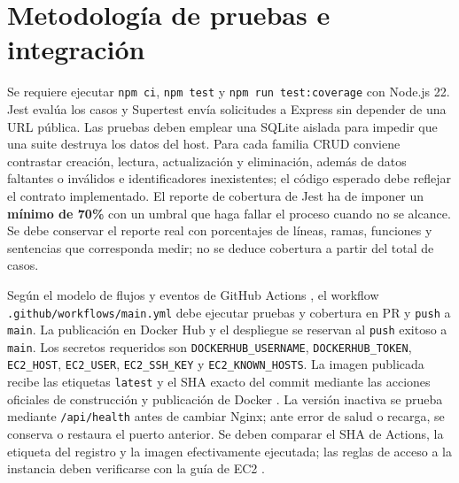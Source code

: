 \documentclass[12pt,a4paper]{article}
\begin{document}
\section{Metodología de pruebas e integración}
Se requiere ejecutar \texttt{npm ci}, \texttt{npm test} y \texttt{npm run test:coverage} con Node.js 22. Jest evalúa los casos y Supertest envía solicitudes a Express sin depender de una URL pública. Las pruebas deben emplear una SQLite aislada para impedir que una suite destruya los datos del host. Para cada familia CRUD conviene contrastar creación, lectura, actualización y eliminación, además de datos faltantes o inválidos e identificadores inexistentes; el código esperado debe reflejar el contrato implementado. El reporte de cobertura de Jest ha de imponer un \textbf{mínimo de 70\%} con un umbral que haga fallar el proceso cuando no se alcance. Se debe conservar el reporte real con porcentajes de líneas, ramas, funciones y sentencias que corresponda medir; no se deduce cobertura a partir del total de casos.

Según el modelo de flujos y eventos de GitHub Actions \cite{github}, el workflow \texttt{.github/workflows/main.yml} debe ejecutar pruebas y cobertura en PR y \texttt{push} a \texttt{main}. La publicación en Docker Hub y el despliegue se reservan al \texttt{push} exitoso a \texttt{main}. Los secretos requeridos son \texttt{DOCKERHUB\_USERNAME}, \texttt{DOCKERHUB\_TOKEN}, \texttt{EC2\_HOST}, \texttt{EC2\_USER}, \texttt{EC2\_SSH\_KEY} y \texttt{EC2\_KNOWN\_HOSTS}. La imagen publicada recibe las etiquetas \texttt{latest} y el SHA exacto del commit mediante las acciones oficiales de construcción y publicación de Docker \cite{docker}. La versión inactiva se prueba mediante \texttt{/api/health} antes de cambiar Nginx; ante error de salud o recarga, se conserva o restaura el puerto anterior. Se deben comparar el SHA de Actions, la etiqueta del registro y la imagen efectivamente ejecutada; las reglas de acceso a la instancia deben verificarse con la guía de EC2 \cite{aws}.
\end{document}
